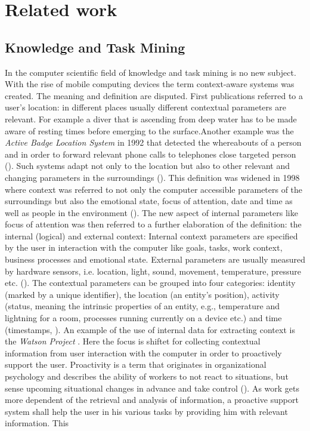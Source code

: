 
\chapter{Related work}
\label{relatedwork}
\section{Knowledge and Task Mining}
In the computer scientific field of knowledge and task mining is no new subject. With the rise of mobile computing devices the term context-aware systems was created. The meaning and definition are disputed. First publications referred to a user's location: in different places usually different contextual parameters are relevant. For example a diver that is ascending from deep water has to be made aware of resting times before emerging to the surface.Another example was the \textit{Active Badge Location System} in 1992 that detected the whereabouts of a person and in order to forward relevant phone calls to telephones close targeted person (\cite{want1992active}). Such systems adapt not only to the location but also to other relevant and changing parameters in the surroundings (\cite{schilit1994context}). This definition was widened in 1998 where context was referred to not only the computer accessible parameters of the surroundings but also the emotional state, focus of attention, date and time as well as people in the environment (\cite{dey1998context}). The new aspect of internal parameters like focus of attention was then referred to a further elaboration of the definition: the internal (logical) and external context: Internal context parameters are specified by the user in interaction with the computer like goals, tasks, work context, business processes and emotional state. External parameters are usually measured by hardware sensors, i.e. location, light, sound, movement, temperature, pressure etc. (\cite{hofer2003context}). The contextual parameters can be grouped into four categories: identity (marked by a unique identifier), the location (an entity’s position), activity (status, meaning the intrinsic properties of an entity, e.g., temperature and lightning for a room, processes running currently on a device etc.) and time (timestamps, \cite{dey2001conceptual}). An example of the use of internal data for extracting context is the \textit{Watson Project} \cite{budzik2000user}. Here the focus is shiftet for collecting contextual information from user interaction with the computer in order to proactively support the user. Proactivity is a term that  originates in organizational psychology and describes the ability of workers to not react to situations, but sense upcoming situational changes in advance and take control (\cite{grant2008dynamics}). As work gets more dependent of the retrieval and analysis of information, a proactive support system shall help the user in his various tasks by providing him with relevant information. This 
